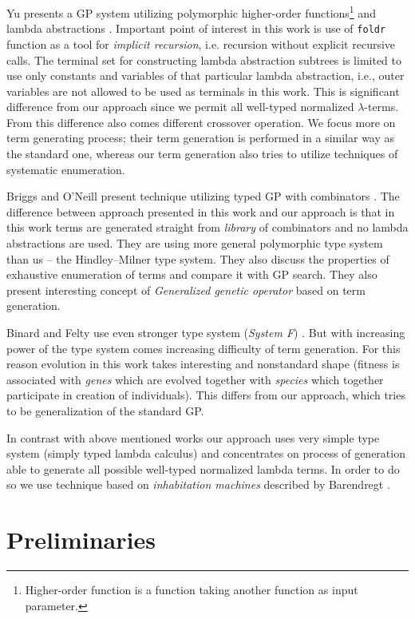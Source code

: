 \documentclass[conference]{IEEEtran}
\newcommand{\lterms}{$\lambda$-terms\xspace}
\begin{document}
Yu presents a GP system utilizing
polymorphic higher-order functions\footnote{Higher-order 
function is a function taking another function as 
input parameter.} and lambda abstractions  \cite{yu01}.
Important point of interest in this work is use of
\texttt{foldr} function as a tool for \textit{implicit recursion},
i.e. recursion without explicit recursive calls. 
The terminal set for constructing lambda abstraction subtrees 
is limited to use only constants and variables of that particular
lambda abstraction, i.e., outer variables are not allowed to be used
as terminals in this work. This is significant difference from our approach 
since we permit all well-typed normalized \lterms. From this difference also
comes different crossover operation. We focus more on term generating process; 
their term generation is performed in a similar way as the standard one, 
whereas our term generation also tries to utilize techniques of systematic enumeration. 

Briggs and O’Neill present technique 
utilizing typed GP with combinators \cite{kes}.
The difference between approach presented in this work
and our approach is that in this work terms are generated
straight from \textit{library} of combinators and no lambda abstractions
are used. They are using more general polymorphic type system than us
-- the Hindley–Milner type system. They also discuss the 
properties of exhaustive enumeration of terms and compare it with GP search.  
They also present interesting concept of \textit{Generalized
genetic operator} based on term generation. 

Binard and Felty use even 
stronger type system (\textit{System F}) \cite{binard2008genetic}.  
But with increasing power of the type system comes increasing difficulty of term generation.
For this reason evolution in this work takes interesting and nonstandard shape 
(fitness is associated with \textit{genes} which are evolved together with \textit{species}
which together participate in creation of individuals).
This differs from our approach, which tries to be generalization of
the standard GP\cite{koza92}.

In contrast with above mentioned works our approach uses very simple type system 
(simply typed lambda calculus) and concentrates on process of generation  
able to generate all possible well-typed normalized lambda terms. In order to do
so we use technique based on \textit{inhabitation machines} 
described by Barendregt \cite{barendregt10}.    


\section{Preliminaries}
\label{preliminaries}
\end{document}
